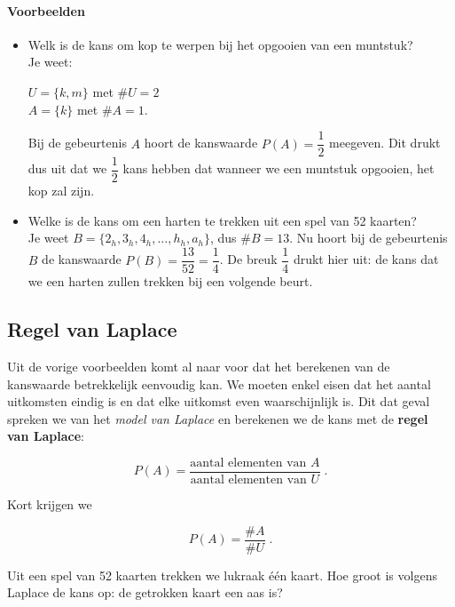 \documentclass[12pt,twoside]{article}
\begin{document}
\paragraph*{Voorbeelden}

\begin{itemize}
  \item Welk is de kans om kop te werpen bij het opgooien van een muntstuk?\\
  Je weet:
  \begin{minipage}[t]{\textwidth}
    $U =\{k, m\}$ met $\#U = 2$\\
    $A = \{k\}$ met $\#A = 1$.
  \end{minipage}
  Bij de gebeurtenis $A$ hoort de kanswaarde $P(A) =\dfrac{1}{2}$ meegeven. Dit drukt dus uit dat we $\dfrac{1}{2}$ kans hebben dat wanneer we een muntstuk opgooien, het kop zal zijn.
  \item Welke is de kans om een harten te trekken uit een spel van 52 kaarten?\\
  Je weet $B = \{2_h , 3_h , 4_h , ..., h_h , a_h\}$, dus $\#B=13$.
  Nu hoort bij de gebeurtenis $B$ de kanswaarde $P(B)=\dfrac{13}{52}=\dfrac{1}{4}$. De breuk $\dfrac{1}{4}$ drukt hier uit: de kans dat we een harten zullen trekken bij een volgende beurt.
\end{itemize}

\subsection{Regel van Laplace}

Uit de vorige voorbeelden komt al naar voor dat het berekenen van de kanswaarde betrekkelijk eenvoudig kan. We moeten enkel eisen dat het aantal uitkomsten eindig is en dat elke uitkomst even waarschijnlijk is. Dit dat geval spreken we van het {\em model van Laplace} en berekenen we de kans met de {\bf regel van Laplace}:

$$P(A)=\dfrac{\mbox{aantal elementen van }A}{\mbox{aantal elementen van }U}\;.$$

Kort krijgen we\\
\begin{mdframed}
$$P(A)=\dfrac{\#A}{\#U}\;.$$
\end{mdframed}

\begin{oefening}
Uit een spel van 52 kaarten trekken we lukraak één kaart. Hoe groot is volgens Laplace de kans op: de getrokken kaart een aas is?
\end{oefening}
\end{document}
